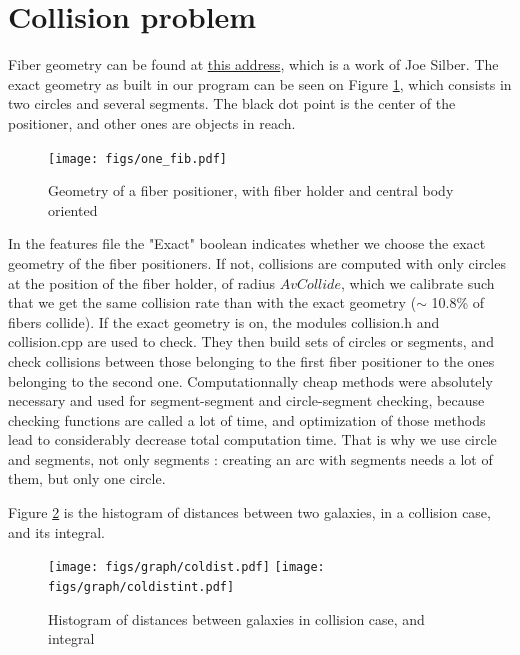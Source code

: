 \documentclass{article}
\begin{document}
\section{Collision problem}
Fiber geometry can be found at \href{https://desi.lbl.gov/DocDB/cgi-bin/private/ShowDocument?docid=899}{this address}, which is a work of Joe Silber. The exact geometry as built in our program can be seen on Figure \ref{onefib}, which consists in two circles and several segments. The black dot point is the center of the positioner, and other ones are objects in reach.

\begin{figure}[H]\begin{center}
	\texttt{[image: figs/one\_fib.pdf]}
	\caption{Geometry of a fiber positioner, with fiber holder and central body oriented}\label{onefib}
\end{center}\end{figure}

In the features file the "Exact" boolean indicates whether we choose the exact geometry of the fiber positioners. If not, collisions are computed with only circles at the position of the fiber holder, of radius $AvCollide$, which we calibrate such that we get the same collision rate than with the exact geometry ($\sim$ 10.8\% of fibers collide). If the exact geometry is on, the modules collision.h and collision.cpp are used to check. They then build sets of circles or segments, and check collisions between those belonging to the first fiber positioner to the ones belonging to the second one.
Computationnally cheap methods were absolutely necessary and used for segment-segment and circle-segment checking, because checking functions are called a lot of time, and optimization of those methods lead to considerably decrease total computation time. That is why we use circle and segments, not only segments : creating an arc with segments needs a lot of them, but only one circle.

Figure \ref{coldist} is the histogram of distances between two galaxies, in a collision case, and its integral.

\begin{figure}[H]\begin{center}
	\texttt{[image: figs/graph/coldist.pdf]}
	\texttt{[image: figs/graph/coldistint.pdf]}
	\caption{Histogram of distances between galaxies in collision case, and integral}\label{coldist}
\end{center}\end{figure}
\end{document}
